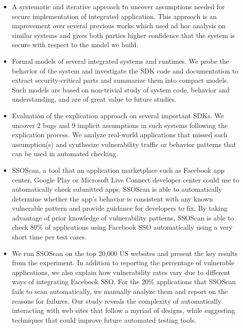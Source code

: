 \begin{itemize}

\item A systematic and iterative approach to uncover assumptions needed for secure implementation of integrated application.  This approach is an improvement over several previous works which used ad hoc analysis on similar systems and gives both parties higher confidence that the system is secure with respect to the model we build.  

\item Formal models of several integrated systems and runtimes.  We probe the behavior of the system and investigate the SDK code and documentation to extract security-critical parts and summarize them into compact models.  Such models are based on non-trivial study of system code, behavior and understanding, and are of great value to future studies.

\item Evaluation of the explication approach on several important SDKs.  We uncover 2 bugs and 9 implicit assumptions in such systems following the explication process.  We analyze real-world applications that missed such assumption(s) and synthesize vulnerability traffic or behavior patterns that can be used in automated checking.

\item SSOScan, a tool that an application marketplace such as Facebook app center, Google Play or Microsoft Live Connect developer center could use to automatically check submitted apps.  SSOScan is able to automatically determine whether the app's behavior is consistent with any known vulnerable pattern and provide guidance for developers to fix.  By taking advantage of prior knowledge of vulnerability patterns, SSOScan is able to check 80\% of applications using Facebook SSO automatically using a very short time per test cases.

\item We run SSOScan on the top 20,000 US websites and present the key results from the experiment.  In addition to reporting the percentage of vulnerable applications, we also explain how vulnerability rates vary due to different ways of integrating Facebook SSO.  For the 20\% applications that SSOScan fails to scan automatically, we manually analyze them and report on the reasons for failures.  Our study reveals the complexity of automatically interacting with web sites that follow a myriad of designs, while suggesting techniques that could improve future automated testing tools. 

\end{itemize}

